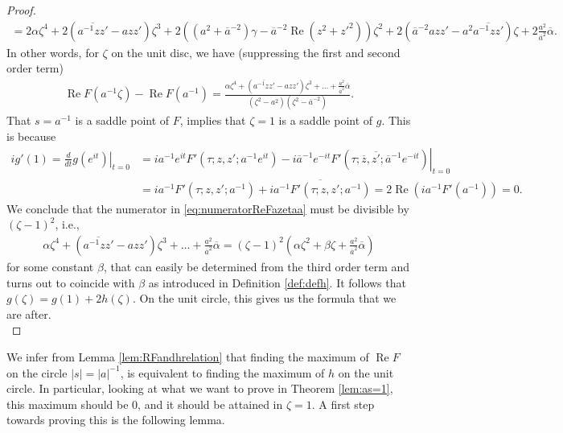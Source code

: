 \documentclass[%
 jmp,
cp,  %
 amsmath,amsthm,amssymb,%
 reprint,%
onecolumn]{revtex4-2}
\begin{document}
\begin{proof}
\begin{multline*}
= 2\alpha \zeta^4
+2(\overline{a^{-1} z z'} - a z z') \zeta^3
+ 2\left((a^2+\overline a^{-2}) \gamma - \overline a^{-2} \operatorname{Re}(z^2+z'^2)\right) \zeta^2
+ 2 (\overline a^{-2} a z z' - a^2 \overline{a^{-1} z z'}) \zeta
+2\frac{a^2}{\overline a^2} \overline \alpha.
\end{multline*}
In other words, for $\zeta$ on the unit disc, we have (suppressing the first and second order term)
\begin{align} \label{eq:numeratorReFazetaa}
\operatorname{Re} F(a^{-1}\zeta) - \operatorname{Re} F(a^{-1})
= \frac{\alpha \zeta^4+(\overline{a^{-1} z z'} - a z z') \zeta^3
+\ldots+\frac{a^2}{\overline a^2} \overline \alpha}{(\zeta^2-a^2)(\zeta^2-\overline a^{-2})}.
\end{align}
That $s=a^{-1}$ is a saddle point of $F$, implies that $\zeta=1$ is a saddle point of $g$. This is because
\begin{align*}
i g'(1) = \left. \frac{d}{dt} g(e^{i t})\right|_{t=0} &= \left. i a^{-1} e^{i t} F'\left(\tau;z,z'; a^{-1} e^{i t}\right) - i \overline a^{-1} e^{- it} F'\left(\tau;\overline z,\overline{z'}; \overline a^{-1} e^{- i t}\right)\right|_{t=0}\\
&= i a^{-1} F'\left(\tau;z,z'; a^{-1}\right) + \overline{i a^{-1} F'\left(\tau;z,z'; a^{-1}\right)}
= 2\operatorname{Re}\left(i a^{-1} F'(a^{-1})\right) = 0.
\end{align*}
We conclude that the numerator in \eqref{eq:numeratorReFazetaa} must be divisible by $(\zeta-1)^2$, i.e.,
\begin{align*}
\alpha \zeta^4+(\overline{a^{-1} z z'} - a z z') \zeta^3
+\ldots+\frac{a^2}{\overline a^2} \overline \alpha
= (\zeta-1)^2 \left(\alpha \zeta^2 + \beta \zeta + \frac{a^2}{\overline a^2} \overline \alpha\right)
\end{align*}
for some constant $\beta$, that can easily be determined from the third order term and turns out to coincide with $\beta$ as introduced in Definition \ref{def:defh}. It follows that $g(\zeta)=g(1)+2 h(\zeta)$. On the unit circle, this gives us the formula that we are after.\\
\end{proof}

We infer from Lemma \ref{lem:RFandhrelation} that finding the maximum of $\operatorname{Re} F$ on the circle $|s|=|a|^{-1}$, is equivalent to finding the maximum of $h$ on the unit circle. In particular, looking at what we want to prove in Theorem \ref{lem:as=1}, this maximum should be $0$, and it should be attained in $\zeta=1$. A first step towards proving this is the following lemma. 
\end{document}
